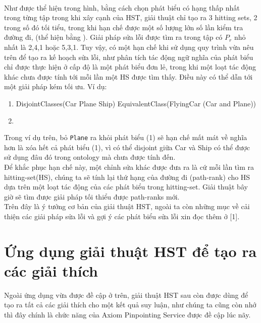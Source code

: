 \\\hspace*{.05\textwidth} Như được thể hiện trong hình, bằng cách chọn phát biểu có hạng thấp nhất trong từng tập trong khi xây cạnh của HST, giải thuật chỉ tạo ra 3 hitting sets, 2 trong số đó tối tiểu, trong khi hạn chế được một số lượng lớn số lần kiểm tra đường đi, (thể hiện bằng \xmark). Giải pháp sửa lỗi được tìm ra trong tập có $P_{r}$ nhỏ nhất là {2,4,1} hoặc {5,3,1}.
\hspace*{.05\textwidth} Tuy vậy, có một hạn chế khi sử dụng quy trình vừa nêu trên để tạo ra kế hoạch sửa lỗi, như phân tích tác động ngữ nghĩa của phát biểu chỉ được thực hiện ở cấp độ là một phát biểu đơn lẻ, trong khi một loạt tác động khác chưa được tính tới mỗi lần một HS được tìm thấy. Điều này có thể dẫn tới một giải pháp kém tối ưu. Ví dụ:
\begin{enumerate}
\item
DisjointClasses(Car Plane Ship)
EquivalentClass(FlyingCar (Car and Plane))
\item
\end{enumerate}
Trong ví dụ trên, bỏ \texttt{Plane} ra khỏi phát biểu (1) sẽ hạn chế mất mát về nghĩa hơn là xóa hết cả phát biểu (1), vì có thể disjoint giữa Car và Ship có thể được sử dụng đâu đó trong ontology mà chưa được tính đến.
\\\hspace*{.05\textwidth} Để khắc phục hạn chế này, một chỉnh sửa khác được đưa ra là cứ mỗi lần tìm ra hitting-set(HS), chúng ta sẽ tính lại thứ hạng của đường đi (path-rank) cho HS dựa trên một loạt tác động của các phát biểu trong hitting-set. Giải thuật bây giờ sẽ tìm được giải pháp tối thiểu được path-ranks mới.
\\
Trên đây là ý tưởng cơ bản của giải thuật HST, ngoài ta còn những mục về cải thiện các giải pháp sửa lỗi và gợi ý các phát biểu sửa lỗi xin đọc thêm ở [1].
\section{Ứng dụng giải thuật HST để tạo ra các giải thích}
Ngoài ứng dụng vừa được đề cập ở trên, giải thuật HST sau còn được dùng để tạo ra tất cả các giải thích cho một kết quả suy luận, như chúng ta cũng còn nhớ thì đây chính là chức năng của Axiom Pinpointing Service được đề cập lúc nãy.
